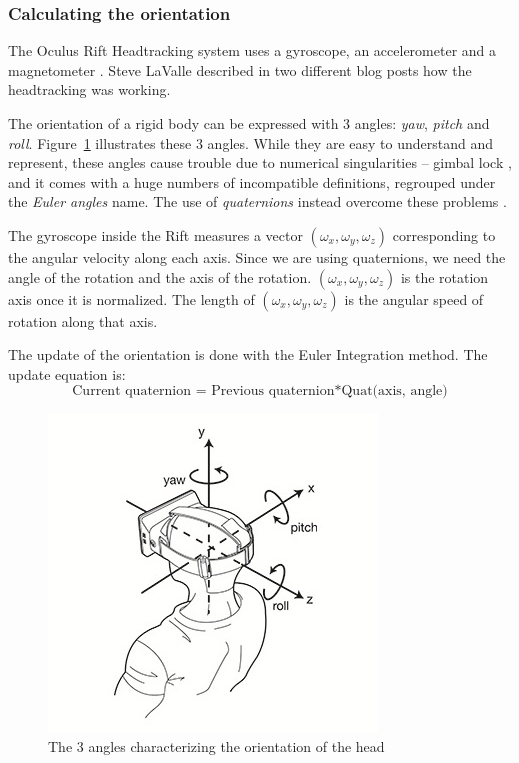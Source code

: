 \documentclass[12pt]{article}
\begin{document}
\subsubsection{Calculating the orientation}
The Oculus Rift Headtracking system uses a gyroscope, an accelerometer and a magnetometer \cite{Oculus2}. Steve LaValle described in two different blog posts \cite{OculusBlog1, OculusBlog2} how the headtracking was working.

The orientation of a rigid body can be expressed with 3 angles: \textit{yaw}, \textit{pitch} and \textit{roll}. Figure~\ref{ypr} illustrates these 3 angles. While they are easy to understand and represent, these angles cause trouble due to numerical singularities -- gimbal lock \cite{lock}, and it comes with a huge numbers of incompatible definitions, regrouped under the \textit{Euler angles} name. The use of \textit{quaternions} instead overcome these problems \cite{Quat}.

The gyroscope inside the Rift measures a vector $(\omega_x,\omega_y,\omega_z)$ corresponding to the angular velocity along each axis. Since we are using quaternions, we need the angle of the rotation and the axis of the rotation. $(\omega_x,\omega_y,\omega_z)$ is the rotation axis once it is normalized. The length of $(\omega_x,\omega_y,\omega_z)$ is the angular speed of rotation along that axis.

The update of the orientation is done with the Euler Integration method. The update equation is:
$$\text{Current quaternion = Previous quaternion} * \text{Quat(axis, angle)}$$

\begin{figure}[h]
  \centering
  \includegraphics[scale=3]{OculusHead.jpg}
  \caption{\label{ypr} The 3 angles characterizing the orientation of the head}
\end{figure}
\end{document}
